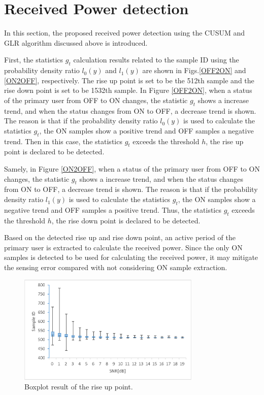 \section{Received Power detection}
In this section, the proposed received power detection using the CUSUM and GLR algorithm discussed above is introduced. 

First, the statistics $g_t$ calculation results related to the sample ID using the probability density ratio $l_0(y)$ and $l_1(y)$ are shown in Figs.\ref{OFF2ON} and \ref{ON2OFF}, respectively. The rise up point is set to be the 512th sample and the rise down point is set to be 1532th sample.
In Figure \ref{OFF2ON}, when a status of the primary user from OFF to ON changes, the statistic $g_t$ shows a increase trend, and when the status changes from ON to OFF, a decrease trend is shown. The reason is that if the probability density ratio $l_0(y)$ is used to calculate the statistics $g_t$, the ON samples show a positive trend and OFF samples a negative trend. Then in this case, the statistics $g_t$ exceeds the threshold $h$, the rise up point is declared to be detected.

Samely, in Figure \ref{ON2OFF}, when a status of the primary user from OFF to ON changes, the statistic $g_t$ shows a increase trend, and when the status changes from ON to OFF, a decrease trend is shown. The reason is that if the probability density ratio $l_1(y)$ is used to calculate the statistics $g_t$, the ON samples show a negative trend and OFF samples a positive trend. Thus, the statistics $g_t$ exceeds the threshold $h$, the rise down point is declared to be detected.

Based on the detected rise up and rise down point, an active period of the primary user is extracted to calculate the received power. Since the only ON samples is detected to be used for calculating the received power, it may mitigate the sensing error compared with not considering ON sample extraction.

\begin{figure}[t]
\centering
\includegraphics[width=87mm]{transition_up.eps}
\caption{Boxplot result of the rise up point.}
\label{transition_up}
\end{figure}



